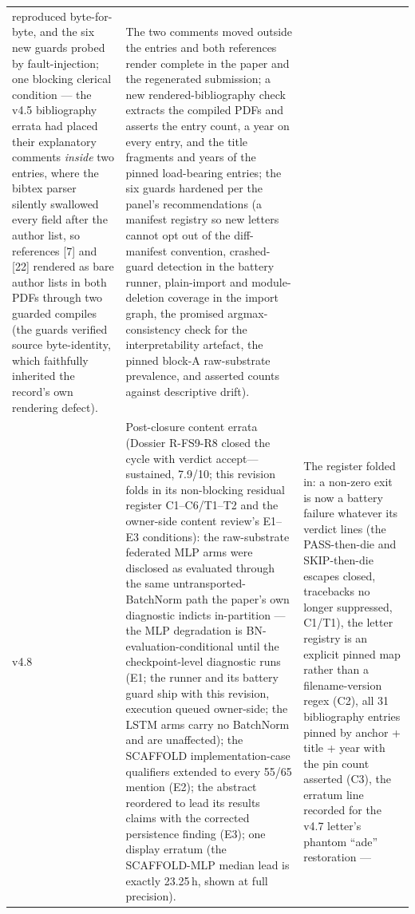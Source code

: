 \begin{longtable}{@{}p{} >{\raggedright\arraybackslash}p{} >{\raggedright\arraybackslash}p{}@{}}
reproduced byte-for-byte, and the six new guards probed by
fault-injection; one blocking clerical condition — the v4.5
bibliography errata had placed their explanatory comments \emph{inside}
two entries, where the bibtex parser silently swallowed every field
after the author list, so references [7] and [22] rendered as bare
author lists in both PDFs through two guarded compiles (the guards
verified source byte-identity, which faithfully inherited the record's
own rendering defect). & The two comments moved outside the entries and
both references render complete in the paper and the regenerated
submission; a new rendered-bibliography check extracts the compiled
PDFs and asserts the entry count, a year on every entry, and the title
fragments and years of the pinned load-bearing entries; the six guards
hardened per the panel's recommendations (a manifest registry so new
letters cannot opt out of the diff-manifest convention, crashed-guard
detection in the battery runner, plain-import and module-deletion
coverage in the import graph, the promised argmax-consistency check for
the interpretability artefact, the pinned block-A raw-substrate
prevalence, and asserted counts against descriptive drift). \\
v4.8 & Post-closure content errata (Dossier R-FS9-R8 closed the cycle
with verdict accept---sustained, 7.9/10; this revision folds in its
non-blocking residual register C1--C6/T1--T2 and the owner-side
content review's E1--E3 conditions): the raw-substrate federated MLP
arms were disclosed as evaluated through the same
untransported-BatchNorm path the paper's own diagnostic indicts
in-partition — the MLP degradation is BN-evaluation-conditional
until the checkpoint-level diagnostic runs (E1; the runner and its
battery guard ship with this revision, execution queued owner-side;
the LSTM arms carry no BatchNorm and are unaffected); the SCAFFOLD
implementation-case qualifiers extended to every 55/65 mention
(E2); the abstract reordered to lead its results claims with the
corrected persistence finding (E3); one display erratum (the
SCAFFOLD-MLP median lead is exactly 23.25\,h, shown at full
precision). & The register folded in: a non-zero exit is now a
battery failure whatever its verdict lines (the PASS-then-die and
SKIP-then-die escapes closed, tracebacks no longer suppressed,
C1/T1), the letter registry is an explicit pinned map rather than a
filename-version regex (C2), all 31 bibliography entries pinned by
anchor + title + year with the pin count asserted (C3), the erratum
line recorded for the v4.7 letter's phantom ``ade'' restoration —

\end{longtable}
